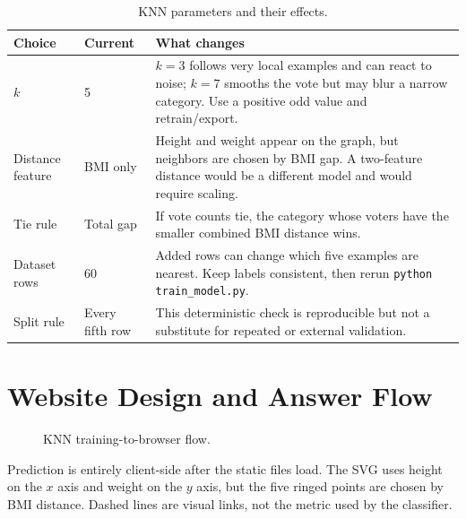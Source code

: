 \documentclass[12pt,a4paper,openany]{report}
\begin{document}
\begin{table}[H]
\centering\small
\caption{KNN parameters and their effects.}
\begin{tabularx}{\textwidth}{p{}p{}Y}
\toprule
\textbf{Choice} & \textbf{Current} & \textbf{What changes} \\
\midrule
$k$ & 5 & $k=3$ follows very local examples and can react to noise; $k=7$ smooths the vote but may blur a narrow category. Use a positive odd value and retrain/export. \\
Distance feature & BMI only & Height and weight appear on the graph, but neighbors are chosen by BMI gap. A two-feature distance would be a different model and would require scaling. \\
Tie rule & Total gap & If vote counts tie, the category whose voters have the smaller combined BMI distance wins. \\
Dataset rows & 60 & Added rows can change which five examples are nearest. Keep labels consistent, then rerun \texttt{python train\_model.py}. \\
Split rule & Every fifth row & This deterministic check is reproducible but not a substitute for repeated or external validation. \\
\bottomrule
\end{tabularx}
\end{table}

\section{Website Design and Answer Flow}
\begin{figure}[H]
\centering
{}
\caption{KNN training-to-browser flow.}
\end{figure}

Prediction is entirely client-side after the static files load. The SVG uses
height on the $x$ axis and weight on the $y$ axis, but the five ringed points are
chosen by BMI distance. Dashed lines are visual links, not the metric used by
the classifier.
\end{document}
